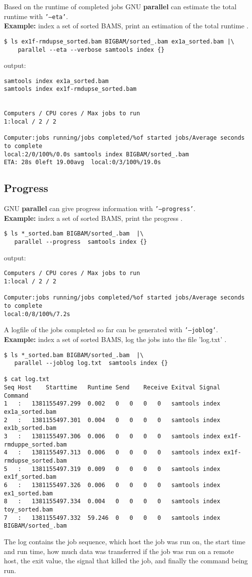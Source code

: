 \documentclass{article}
\newcommand{\example}[1]{
\textbf{Example: } {\color[rgb]{0,0,1} #1 } .
}
\newcommand{\cmdoption}[1]{\texttt{'#1'}}
\def\prl{\textbf{parallel}}
\begin{document}
Based on the runtime of completed jobs GNU \prl{} can estimate the total runtime with \cmdoption{--eta}.\\
\example{index a set of sorted BAMS, print an estimation of the total runtime}
\begin{lstlisting}
$ ls ex1f-rmdupse_sorted.bam BIGBAM/sorted_.bam ex1a_sorted.bam |\
	parallel --eta --verbose samtools index {} 
\end{lstlisting}
output:
\begin{lstlisting}
samtools index ex1a_sorted.bam
samtools index ex1f-rmdupse_sorted.bam


Computers / CPU cores / Max jobs to run
1:local / 2 / 2

Computer:jobs running/jobs completed/%of started jobs/Average seconds to complete
local:2/0/100%/0.0s samtools index BIGBAM/sorted_.bam
ETA: 28s 0left 19.00avg  local:0/3/100%/19.0s 
\end{lstlisting}


\subsection{Progress}
GNU \prl{} can give progress information with \cmdoption{--progress}.\\
\example{index a set of sorted BAMS, print the progress}
\begin{lstlisting}
$ ls *_sorted.bam BIGBAM/sorted_.bam  |\
   parallel --progress  samtools index {}
\end{lstlisting}
output:
\begin{lstlisting}
Computers / CPU cores / Max jobs to run
1:local / 2 / 2

Computer:jobs running/jobs completed/%of started jobs/Average seconds to complete
local:0/8/100%/7.2s 
\end{lstlisting}

A logfile of the jobs completed so far can be generated with \cmdoption{--joblog}.\\
\example{index a set of sorted BAMS, log the jobs into the file 'log.txt'}
\begin{lstlisting}
$ ls *_sorted.bam BIGBAM/sorted_.bam  |\
   parallel --joblog log.txt  samtools index {}

$ cat log.txt
Seq	Host	Starttime	Runtime	Send	Receive	Exitval	Signal	Command
1	:	1381155497.299	0.002	0	0	0	0	samtools index ex1a_sorted.bam
2	:	1381155497.301	0.004	0	0	0	0	samtools index ex1b_sorted.bam
3	:	1381155497.306	0.006	0	0	0	0	samtools index ex1f-rmduppe_sorted.bam
4	:	1381155497.313	0.006	0	0	0	0	samtools index ex1f-rmdupse_sorted.bam
5	:	1381155497.319	0.009	0	0	0	0	samtools index ex1f_sorted.bam
6	:	1381155497.326	0.006	0	0	0	0	samtools index ex1_sorted.bam
8	:	1381155497.334	0.004	0	0	0	0	samtools index toy_sorted.bam
7	:	1381155497.332	59.246	0	0	0	0	samtools index BIGBAM/sorted_.bam
\end{lstlisting}
The log contains the job sequence, which host the job was run on, the start time and run time, how much data was transferred if the job was run on a remote host, the exit value, the signal that killed the job, and finally the command being run.\\
\end{document}
